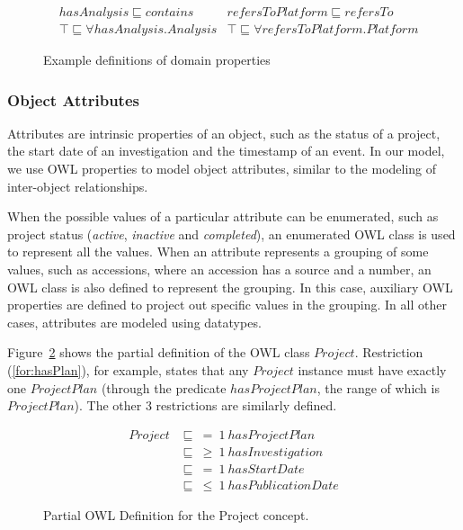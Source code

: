 \documentclass{elsarticle}
\begin{document}
\vspace{-8pt}
\begin{figure}[htb]
\small\centering
\begin{align*}
&hasAnalysis\sqsubseteq contains & refersToPlatform \sqsubseteq refersTo\\
&\top\sqsubseteq \forall hasAnalysis.Analysis & \top \sqsubseteq \forall refersToPlatform.Platform
\end{align*}

\vspace{-8pt}
\caption{Example definitions of domain properties}\label{fig:props}
\end{figure}


\subsubsection{Object Attributes}
Attributes are intrinsic properties of an object, such as the status
of a project, the start date of an investigation and the timestamp
of an event. In our model, we use OWL properties to model object
attributes, similar to the modeling of inter-object relationships.

When the possible values of a particular attribute can be enumerated,
such as project status (\emph{active}, \emph{inactive} and \emph{completed}),
an enumerated OWL class is used to represent all the values.
When an attribute represents a grouping of some values, such
as accessions, where an accession has a source and a number,
an OWL class is also defined to represent the grouping.
In this case, auxiliary OWL properties are defined to project
out specific values in the grouping. In all other cases, attributes
are modeled using datatypes.

Figure~\ref{fig:project_owl} shows the partial definition of the OWL
class $Project$. Restriction
(\ref{for:hasPlan}), for example, states that any $Project$ instance must have
exactly one $ProjectPlan$ (through the predicate $hasProjectPlan$,
the range of which is $ProjectPlan$). The other 3 restrictions are
similarly defined.

\vspace{-8pt}
\begin{figure}[htb]
\centering
\small
\begin{align}
Project &\sqsubseteq~ =~ 1~ hasProjectPlan\label{for:hasPlan}\\
        &\sqsubseteq~ \geq~ 1~ hasInvestigation\\
        &\sqsubseteq~ =~ 1~ hasStartDate\\
        &\sqsubseteq~ \leq~ 1~ hasPublicationDate
\end{align}
\vspace{-16pt} \caption{Partial OWL Definition for the Project
concept.}\label{fig:project_owl}
\end{figure}
\end{document}
